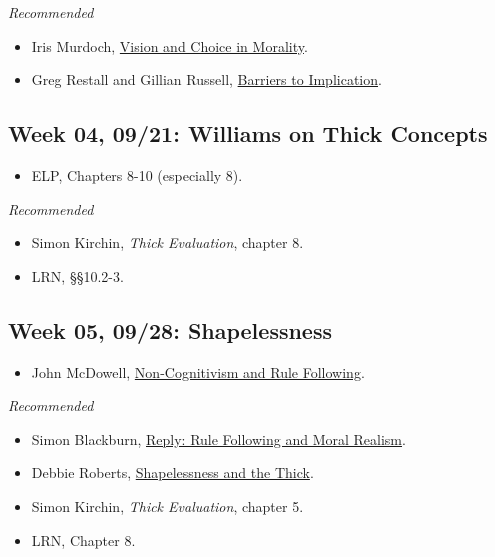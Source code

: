 \documentclass[
]{article}
\providecommand{\tightlist}{%
  \setlength{\itemsep}{0pt}\setlength{\parskip}{0pt}}
\begin{document}
\emph{Recommended}

\begin{itemize}
\tightlist
\item
  Iris Murdoch,
  \href{https://www.jstor.org/stable/4106662?seq=19\#metadata_info_tab_contents}{Vision
  and Choice in Morality}.
\item
  Greg Restall and Gillian Russell,
  \href{https://consequently.org/papers/barriers.pdf}{Barriers to
  Implication}.
\end{itemize}

\hypertarget{week-04-0921-williams-on-thick-concepts}{%
\subsection{Week 04, 09/21: Williams on Thick
Concepts}\label{week-04-0921-williams-on-thick-concepts}}

\begin{itemize}
\tightlist
\item
  ELP, Chapters 8-10 (especially 8).
\end{itemize}

\emph{Recommended}

\begin{itemize}
\tightlist
\item
  Simon Kirchin, \emph{Thick Evaluation}, chapter 8.
\item
  LRN, §§10.2-3.
\end{itemize}

\hypertarget{week-05-0928-shapelessness}{%
\subsection{Week 05, 09/28:
Shapelessness}\label{week-05-0928-shapelessness}}

\begin{itemize}
\tightlist
\item
  John McDowell,
  \href{http://brian.weatherson.org/640-F21/McDowell.pdf}{Non-Cognitivism
  and Rule Following}.
\end{itemize}

\emph{Recommended}

\begin{itemize}
\tightlist
\item
  Simon Blackburn,
  \href{http://brian.weatherson.org/640-F21/Blackburn.pdf}{Reply: Rule
  Following and Moral Realism}.
\item
  Debbie Roberts,
  \href{https://www.jstor.org/stable/10.1086/658898}{Shapelessness and
  the Thick}.
\item
  Simon Kirchin, \emph{Thick Evaluation}, chapter 5.
\item
  LRN, Chapter 8.
\end{itemize}
\end{document}
